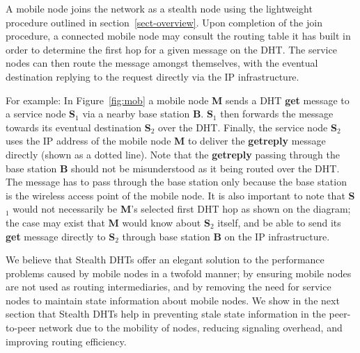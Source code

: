 \documentclass[conference]{IEEEtran}
\begin{document}
A mobile node joins the network as a stealth node using the
lightweight procedure outlined in section~\ref{sect-overview}. Upon
completion of the join procedure, a connected mobile node may
consult the routing table it has built in order to determine the
first hop for a given message on the DHT. The service nodes can then
route the message amongst themselves, with the eventual destination
replying to the request directly via the IP infrastructure.

For example: In Figure~\ref{fig:mob} a mobile node {\bf M} sends a
DHT {\bf get} message to a service node {\bf S$_1$} via a nearby
base station {\bf B}. {\bf S$_1$} then forwards the message towards
its eventual destination {\bf S$_2$} over the DHT. Finally, the
service node {\bf S$_2$} uses the IP address of the mobile node {\bf
M} to deliver the {\bf getreply} message directly (shown as a dotted
line). Note that the {\bf getreply} passing through the base station
{\bf B} should not be misunderstood as it being routed over the DHT.
The message has to pass through the base station  only because the
base station is the wireless access point of the mobile node. It is
also important to note that {\bf S$_1$} would not necessarily be
{\bf M}'s selected first DHT hop as shown on the diagram; the case
may exist that {\bf M} would know about {\bf S$_2$} itself, and be
able to send its {\bf get} message directly to {\bf S$_2$} through
base station {\bf B} on the IP infrastructure.



We believe that Stealth DHTs offer an elegant solution to the
performance problems caused by mobile nodes in a twofold manner; by
ensuring mobile nodes are not used as routing intermediaries, and by
removing the need for service nodes to maintain state information
about mobile nodes. We show in the next section that Stealth DHTs
help in preventing stale state information in the peer-to-peer
network due to the mobility of nodes, reducing signaling overhead,
and improving routing efficiency.
\end{document}
